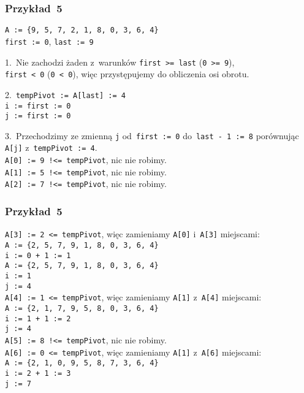 \documentclass[10pt,t]{beamer}
\begin{document}




\begin{frame}
  \frametitle{Przykład~5}


  \texttt{A := \{9, 5, 7, 2, 1, 8, 0, 3, 6, 4\} } \\
  \texttt{first := 0}, \texttt{last := 9}

  1.~Nie zachodzi żaden z~warunków \texttt{first >= last}
  (\texttt{0 >= 9}), \\
  \texttt{first < 0} (\texttt{0 < 0}), więc przystępujemy do obliczenia
  osi obrotu.

  2.~\texttt{tempPivot := A[last] := 4} \\
  \texttt{i := first := 0} \\
  \texttt{j := first := 0}

  3.~Przechodzimy ze zmienną \texttt{j} od~\texttt{first := 0}
  do~\texttt{last - 1 := 8} porównując \texttt{A[j]}
  z~\texttt{tempPivot := 4}. \\
  \texttt{A[0] := 9 !<= tempPivot}, nic nie robimy. \\
  \texttt{A[1] := 5 !<= tempPivot}, nic nie robimy. \\
  \texttt{A[2] := 7 !<= tempPivot}, nic nie robimy. \\

\end{frame}





\begin{frame}
  \frametitle{Przykład~5}


  \texttt{A[3] := 2 <= tempPivot}, więc zamieniamy \texttt{A[0]}
  i~\texttt{A[3]} miejscami: \\
  \texttt{A := \{2, 5, 7, 9, 1, 8, 0, 3, 6, 4\} } \\
  \texttt{i := 0 + 1 := 1} \\
  \texttt{A := \{2, 5, 7, 9, 1, 8, 0, 3, 6, 4\} } \\
  \texttt{i := 1} \\
  \texttt{j := 4} \\
  \texttt{A[4] := 1 <= tempPivot}, więc zamieniamy \texttt{A[1]}
  z~\texttt{A[4]} miejscami: \\
  \texttt{A := \{2, 1, 7, 9, 5, 8, 0, 3, 6, 4\} } \\
  \texttt{i := 1 + 1 := 2} \\
  \texttt{j := 4} \\
  \texttt{A[5] := 8 !<= tempPivot}, nic nie robimy. \\
  \texttt{A[6] := 0 <= tempPivot}, więc zamieniamy \texttt{A[1]}
  z~\texttt{A[6]} miejscami: \\
  \texttt{A := \{2, 1, 0, 9, 5, 8, 7, 3, 6, 4\} } \\
  \texttt{i := 2 + 1 := 3} \\
  \texttt{j := 7}

\end{frame}
\end{document}
